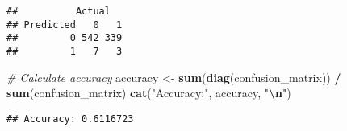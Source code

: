 \documentclass[
]{article}
\newenvironment{Shaded}{\begin{snugshade}}{\end{snugshade}}
\newcommand{\CommentTok}[1]{\textcolor[rgb]{0.56,0.35,0.01}{\textit{#1}}}
\newcommand{\FunctionTok}[1]{\textcolor[rgb]{0.13,0.29,0.53}{\textbf{#1}}}
\newcommand{\NormalTok}[1]{#1}
\newcommand{\OtherTok}[1]{\textcolor[rgb]{0.56,0.35,0.01}{#1}}
\newcommand{\SpecialCharTok}[1]{\textcolor[rgb]{0.81,0.36,0.00}{\textbf{#1}}}
\newcommand{\StringTok}[1]{\textcolor[rgb]{0.31,0.60,0.02}{#1}}
\begin{document}
\begin{verbatim}
##          Actual
## Predicted   0   1
##         0 542 339
##         1   7   3
\end{verbatim}

\begin{Shaded}
\begin{Highlighting}[]
\CommentTok{\# Calculate accuracy}
\NormalTok{accuracy }\OtherTok{\textless{}{-}} \FunctionTok{sum}\NormalTok{(}\FunctionTok{diag}\NormalTok{(confusion\_matrix)) }\SpecialCharTok{/} \FunctionTok{sum}\NormalTok{(confusion\_matrix)}
\FunctionTok{cat}\NormalTok{(}\StringTok{"Accuracy:"}\NormalTok{, accuracy, }\StringTok{"}\SpecialCharTok{\textbackslash{}n}\StringTok{"}\NormalTok{)}
\end{Highlighting}
\end{Shaded}

\begin{verbatim}
## Accuracy: 0.6116723
\end{verbatim}
\end{document}
